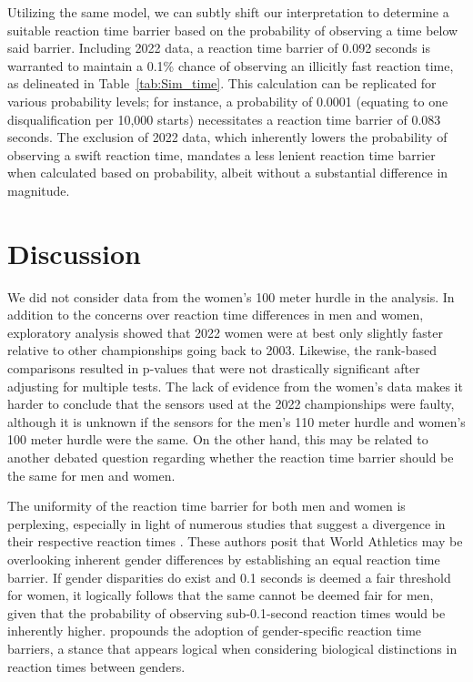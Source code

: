 \documentclass[12pt, letterpaper]{article}
\begin{document}
Utilizing the same model, we can subtly shift our interpretation to determine a
suitable reaction time barrier based on the probability of observing a time
below said barrier. Including 2022 data, a reaction time barrier of 0.092
seconds is warranted to maintain a 0.1\% chance of observing an illicitly fast
reaction time, as delineated in Table~\ref{tab:Sim_time}. This calculation can
be replicated for various probability levels; for instance, a probability of
0.0001 (equating to one disqualification per 10,000 starts) necessitates a
reaction time barrier of 0.083 seconds. The exclusion of 2022 data, which
inherently lowers the probability of observing a swift reaction time, mandates a
less lenient reaction time barrier when calculated based on probability, albeit
without a substantial difference in magnitude.


\section{Discussion}\label{sec:concludingremarks}


We did not consider data from the women's 100 meter hurdle in the analysis.
In addition to the concerns over reaction time differences in men and
women, exploratory analysis showed that 2022 women were at best only
slightly faster relative to other championships going back to 2003.
Likewise, the rank-based comparisons resulted in p-values
that were not drastically significant after adjusting for multiple tests.
The lack of evidence from the women's data makes it 
harder to conclude that the sensors used at the 2022 championships were faulty, 
although it is unknown if the sensors for the men's 110 meter hurdle and women's
100 meter hurdle were the same. On the other hand, this may be related to 
another debated question regarding whether the reaction time barrier should be 
the same for men and women.


The uniformity of the reaction time barrier for both men and women is
perplexing, especially in light of numerous studies that suggest a divergence in
their respective reaction times \citep[e.g.,][]{lipps2011implications,
  babicc2009reaction, panoutsakopoulos2020gender}. These authors posit that
World Athletics may be overlooking inherent gender differences by establishing
an equal reaction time barrier. If gender disparities do exist and 0.1 seconds
is deemed a fair threshold for women, it logically follows that the same cannot
be deemed fair for men, given that the probability of observing sub-0.1-second
reaction times would be inherently higher. \citet{brosnan2017effects} propounds
the adoption of gender-specific reaction time barriers, a stance that appears
logical when considering biological distinctions in reaction times between
genders.
\end{document}
